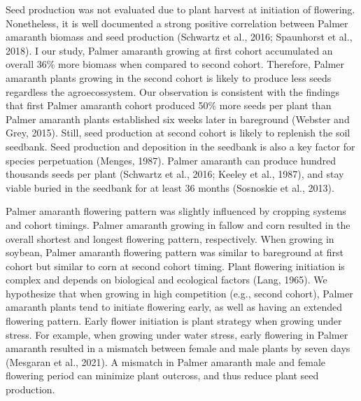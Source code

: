 \documentclass[utf8]{frontiersSCNS}
\begin{document}
Seed production was not evaluated due to plant harvest at initiation of
flowering. Nonetheless, it is well documented a strong positive
correlation between Palmer amaranth biomass and seed production
(Schwartz et al., 2016; Spaunhorst et al., 2018). I our study, Palmer
amaranth growing at first cohort accumulated an overall 36\% more
biomass when compared to second cohort. Therefore, Palmer amaranth
plants growing in the second cohort is likely to produce less seeds
regardless the agroecossystem. Our observation is consistent with the
findings that first Palmer amaranth cohort produced 50\% more seeds per
plant than Palmer amaranth plants established six weeks later in
bareground (Webster and Grey, 2015). Still, seed production at second
cohort is likely to replenish the soil seedbank. Seed production and
deposition in the seedbank is also a key factor for species perpetuation
(Menges, 1987). Palmer amaranth can produce hundred thousands seeds per
plant (Schwartz et al., 2016; Keeley et al., 1987), and stay viable
buried in the seedbank for at least 36 months (Sosnoskie et al., 2013).

Palmer amaranth flowering pattern was slightly influenced by cropping
systems and cohort timings. Palmer amaranth growing in fallow and corn
resulted in the overall shortest and longest flowering pattern,
respectively. When growing in soybean, Palmer amaranth flowering pattern
was similar to bareground at first cohort but similar to corn at second
cohort timing. Plant flowering initiation is complex and depends on
biological and ecological factors (Lang, 1965). We hypothesize that when
growing in high competition (e.g., second cohort), Palmer amaranth
plants tend to initiate flowering early, as well as having an extended
flowering pattern. Early flower initiation is plant strategy when
growing under stress. For example, when growing under water stress,
early flowering in Palmer amaranth resulted in a mismatch between female
and male plants by seven days (Mesgaran et al., 2021). A mismatch in
Palmer amaranth male and female flowering period can minimize plant
outcross, and thus reduce plant seed production.
\end{document}
